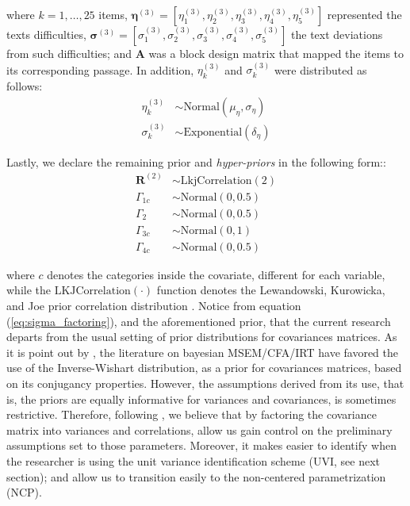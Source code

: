 \noindent where $k=1, \dots, 25$ items, $\pmb{\eta}^{(3)} = [ \eta^{(3)}_{1}, \eta^{(3)}_{2}, \eta^{(3)}_{3}, \eta^{(3)}_{4}, \eta^{(3)}_{5} ]$ represented the texts difficulties, $\pmb{\sigma}^{(3)} = [ \sigma^{(3)}_{1}, \sigma^{(3)}_{2}, \sigma^{(3)}_{3}, \sigma^{(3)}_{4}, \sigma^{(3)}_{5} ]$ the text deviations from such difficulties; and $\mathbf{A}$ was a block design matrix that mapped the items to its corresponding passage. In addition, $\eta^{(3)}_{k}$ and $\sigma^{(3)}_{k}$ were distributed as follows:
%
\begin{align}
	\eta^{(3)}_{k} &\sim \text{Normal} \left( \mu_{\eta}, \sigma_{\eta} \right) \\
	\sigma^{(3)}_{k} &\sim \text{Exponential} \left( \delta_{\eta} \right)
\end{align}

Lastly, we declare the remaining prior and \textit{hyper-priors} in the following form::
%
\begin{align}
	\boldsymbol{R}^{(2)} &\sim \text{LkjCorrelation}( 2 ) \\
	\Gamma_{1c} &\sim \text{Normal}( 0, 0.5 ) \\
	\Gamma_{2} &\sim \text{Normal}( 0, 0.5 ) \\
	\Gamma_{3c} &\sim \text{Normal}( 0, 1 ) \\
	\Gamma_{4c} &\sim \text{Normal}( 0, 0.5 ) 
\end{align}

\noindent where $c$ denotes the categories inside the covariate, different for each variable, while the $\text{LKJCorrelation}(\cdot)$ function denotes the Lewandowski, Kurowicka, and Joe prior correlation distribution \cite{Lewandowski_et_al_2009}. Notice from equation (\ref{eq:sigma_factoring}), and the aforementioned prior, that the current research departs from the usual setting of prior distributions for covariances matrices. As it is point out by \citet{Depaoli_2021}, the literature on bayesian MSEM/CFA/IRT have favored the use of the Inverse-Wishart distribution, as a prior for covariances matrices, based on its conjugancy properties. However, the assumptions derived from its use, that is, the priors are equally informative for variances and covariances, is sometimes restrictive. Therefore, following \citet{McElreath_2020}, we believe that by factoring the covariance matrix into variances and correlations, allow us gain control on the preliminary assumptions set to those parameters. Moreover, it makes easier to identify when the researcher is using the unit variance identification scheme (UVI, see next section); and allow us to transition easily to the non-centered parametrization (NCP).


